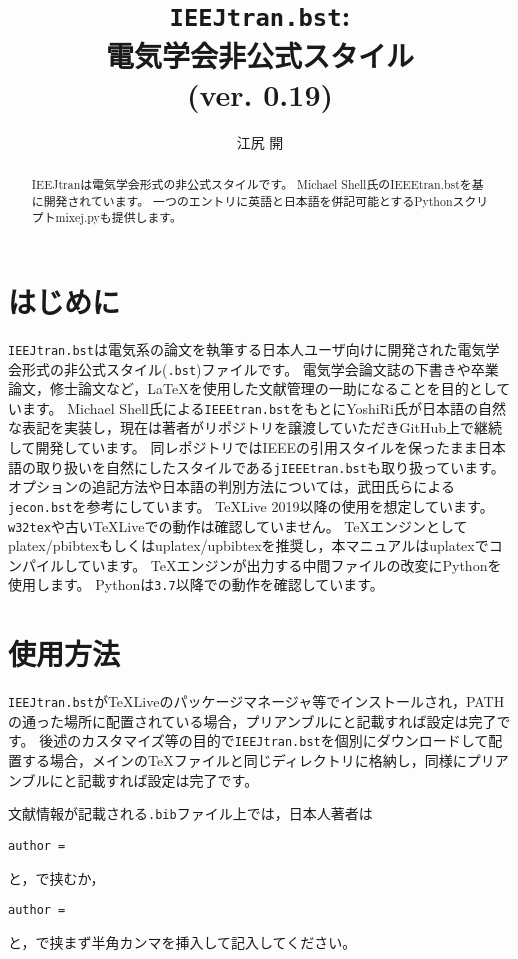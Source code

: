 \documentclass[11pt, a4paper, dvipdfmx, uplatex]{jsarticle}
\title{\texttt{IEEJtran.bst}:\\電気学会非公式\BibTeX スタイル\\(ver. 0.19)}
\author{江尻 開}
\begin{document}
\maketitle

\begin{abstract}
IEEJtranは電気学会形式の非公式\BibTeX スタイルです。
Michael Shell氏のIEEEtran.bstを基に開発されています。
一つのエントリに英語と日本語を併記可能とするPythonスクリプトmixej.pyも提供します。
\end{abstract}


\section{はじめに}

\texttt{IEEJtran.bst}は電気系の論文を執筆する日本人ユーザ向けに開発された電気学会形式の非公式\BibTeX スタイル(\texttt{.bst})ファイルです。
電気学会論文誌の下書きや卒業論文，修士論文など，\LaTeX を使用した文献管理の一助になることを目的としています。
Michael Shell氏による\texttt{IEEEtran.bst}\cite{IEEEtran}をもとにYoshiRi氏が日本語の自然な表記を実装し，現在は著者がリポジトリを譲渡していただきGitHub上\cite{jIEEEtran}で継続して開発しています。
同レポジトリではIEEEの引用スタイルを保ったまま日本語の取り扱いを自然にした\BibTeX スタイルである\texttt{jIEEEtran.bst}も取り扱っています。
オプションの追記方法や日本語の判別方法については，武田氏らによる\texttt{jecon.bst}\cite{jeconbst}を参考にしています。
\TeX Live 2019以降の使用を想定しています。
\texttt{w32tex}や古い\TeX Liveでの動作は確認していません。
\TeX エンジンとしてplatex/pbibtexもしくはuplatex/upbibtexを推奨し，本マニュアルはuplatexでコンパイルしています。
\TeX エンジンが出力する中間ファイルの改変にPythonを使用します。
Pythonは\texttt{3.7}以降での動作を確認しています。


\section{使用方法}

\texttt{IEEJtran.bst}が\TeX Liveのパッケージマネージャ等でインストールされ，PATHの通った場所に配置されている場合，プリアンブルに\texttt{\string{}}と記載すれば設定は完了です。
後述のカスタマイズ等の目的で\texttt{IEEJtran.bst}を個別にダウンロードして配置する場合，メインの\TeX ファイルと同じディレクトリに格納し，同様にプリアンブルに\texttt{\string{}}と記載すれば設定は完了です。

文献情報が記載される\texttt{.bib}ファイル上では，日本人著者は
\begin{center}
  \texttt{author = }
\end{center}
と，\texttt{\string{\string}}で挟むか，
\begin{center}
  \texttt{author = }
\end{center}
と，\texttt{\string{\string}}で挟まず半角カンマを挿入して記入してください。
\end{document}
